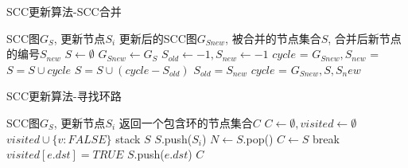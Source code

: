 \documentclass{article}
\begin{document}
\begin{algorithm}
\caption{SCC更新算法-SCC合并}
\begin{algorithmic}[1]
\Require SCC图$G_S$, 更新节点$S_i$
\Ensure 更新后的SCC图$G_{Snew}$, 被合并的节点集合$S$, 合并后新节点的编号$S_{new}$
    \State $S \gets \emptyset$
    \State $G_{Snew} \gets G_{S}$ 
    \State $S_{old} \gets -1 , S_{new} \gets -1$
    \State $cycle$ = 
        \State $G_{Snew}, S_{new}$ = 
            \State $S = S \cup cycle$
        \Else 
            \State $S = S \cup ( cycle - S_{old} ) $ 
        \EndIf
        \State $S_{old} = S_{new}$
        \State $cycle$ = 
    \EndWhile
    \State \Return $G_{Snew}, S, S_new$
\EndFunction
\end{algorithmic}
\end{algorithm}

\begin{algorithm}
\caption{SCC更新算法-寻找环路}
\begin{algorithmic}[1]
\Require SCC图$G_S$, 更新节点$S_i$
\Ensure 返回一个包含环的节点集合$C$
    \State $C \gets \emptyset, visited \gets \emptyset$
        \State $visited \cup \{ v:FALSE \}$
    \EndFor
    \State stack $S$
    \State $S$.push($S_i$)
        \State $N \gets S$.pop() 
                \State $C \gets S$
                \State break
            \EndIf
                \State $visited[e.dst] = TRUE$ 
                \State $S$.push($e.dst$)
            \EndIf
        \EndFor
    \EndWhile
    \State \Return $C$
\EndFunction
\end{algorithmic}
\end{algorithm}
\end{document}
